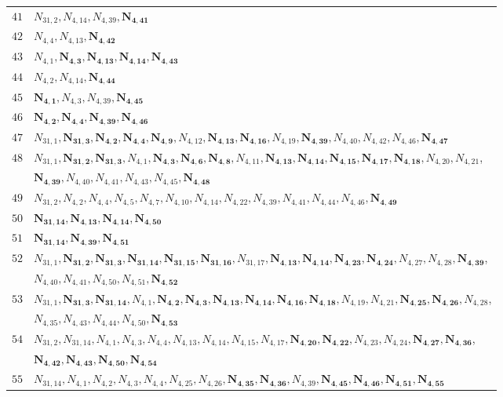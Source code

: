 \documentclass{amsart}
\theoremstyle{plain}
\theoremstyle{definition}
\theoremstyle{remark}
\begin{document}
{\begin{longtable}{ll}
$41$ & $N_{31,2}, N_{4,14}, N_{4,39}, \bm{N_{4,41}}$\\
$42$ & $N_{4,4}, N_{4,13}, \bm{N_{4,42}}$\\
$43$ & $N_{4,1}, \bm{N_{4,3}}, \bm{N_{4,13}}, \bm{N_{4,14}}, \bm{N_{4,43}}$\\
$44$ & $N_{4,2}, N_{4,14}, \bm{N_{4,44}}$\\
$45$ & $\bm{N_{4,1}}, N_{4,3}, N_{4,39}, \bm{N_{4,45}}$\\
$46$ & $\bm{N_{4,2}}, \bm{N_{4,4}}, \bm{N_{4,39}}, \bm{N_{4,46}}$\\
$47$ & $N_{31,1}, \bm{N_{31,3}}, \bm{N_{4,2}}, \bm{N_{4,4}}, \bm{N_{4,9}}, N_{4,12}, \bm{N_{4,13}}, \bm{N_{4,16}}, N_{4,19}, \bm{N_{4,39}}, N_{4,40}, N_{4,42}, N_{4,46}, \bm{N_{4,47}}$\\
$48$ & $N_{31,1}, \bm{N_{31,2}}, \bm{N_{31,3}}, N_{4,1}, \bm{N_{4,3}}, \bm{N_{4,6}}, \bm{N_{4,8}}, N_{4,11}, \bm{N_{4,13}}, \bm{N_{4,14}}, \bm{N_{4,15}}, \bm{N_{4,17}}, \bm{N_{4,18}}, N_{4,20}, N_{4,21}$,\\ 
& $\bm{N_{4,39}}, N_{4,40}, N_{4,41}, N_{4,43}, N_{4,45}, \bm{N_{4,48}}$\\
$49$ & $N_{31,2}, N_{4,2}, N_{4,4}, N_{4,5}, N_{4,7}, N_{4,10}, N_{4,14}, N_{4,22}, N_{4,39}, N_{4,41}, N_{4,44}, N_{4,46}, \bm{N_{4,49}}$\\
$50$ & $\bm{N_{31,14}}, \bm{N_{4,13}}, \bm{N_{4,14}}, \bm{N_{4,50}}$\\
$51$ & $\bm{N_{31,14}}, \bm{N_{4,39}}, \bm{N_{4,51}}$\\
$52$ & $N_{31,1}, \bm{N_{31,2}}, \bm{N_{31,3}}, \bm{N_{31,14}}, \bm{N_{31,15}}, \bm{N_{31,16}}, N_{31,17}, \bm{N_{4,13}}, \bm{N_{4,14}}, \bm{N_{4,23}}, \bm{N_{4,24}}, N_{4,27}, N_{4,28}, \bm{N_{4,39}}$,\\ 
& $N_{4,40}, N_{4,41}, N_{4,50}, N_{4,51}, \bm{N_{4,52}}$\\
$53$ & $N_{31,1}, \bm{N_{31,3}}, \bm{N_{31,14}}, N_{4,1}, \bm{N_{4,2}}, \bm{N_{4,3}}, \bm{N_{4,13}}, \bm{N_{4,14}}, \bm{N_{4,16}}, \bm{N_{4,18}}, N_{4,19}, N_{4,21}, \bm{N_{4,25}}, \bm{N_{4,26}}, N_{4,28}$,\\ 
& $N_{4,35}, N_{4,43}, N_{4,44}, N_{4,50}, \bm{N_{4,53}}$\\
$54$ & $N_{31,2}, N_{31,14}, N_{4,1}, N_{4,3}, N_{4,4}, N_{4,13}, N_{4,14}, N_{4,15}, N_{4,17}, \bm{N_{4,20}}, \bm{N_{4,22}}, N_{4,23}, N_{4,24}, \bm{N_{4,27}}, \bm{N_{4,36}}$,\\ 
& $\bm{N_{4,42}}, \bm{N_{4,43}}, \bm{N_{4,50}}, \bm{N_{4,54}}$\\
$55$ & $N_{31,14}, N_{4,1}, N_{4,2}, N_{4,3}, N_{4,4}, N_{4,25}, N_{4,26}, \bm{N_{4,35}}, \bm{N_{4,36}}, N_{4,39}, \bm{N_{4,45}}, \bm{N_{4,46}}, \bm{N_{4,51}}, \bm{N_{4,55}}$\\

\end{longtable}}
\end{document}

